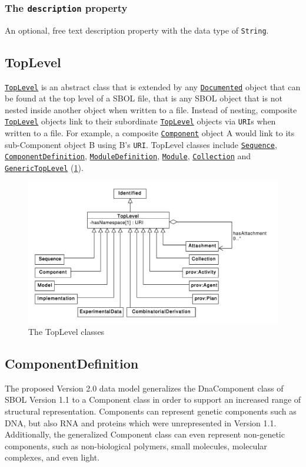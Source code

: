 \documentclass[draftspec]{sbmlpkgspec}
\newcommand{\sbolheading}[1]{\texttt{#1}}
\newcommand{\sbol}[1]{\texttt{\hyperref[sec:#1]{#1}}}
\newcommand{\external}[1]{\texttt{#1}}
\begin{document}
\subsubsection*{The \sbolheading{description} property}
\label{sec:description}
An optional, free text description property with the data type of \external{String}.




\subsection {TopLevel}
\label{sec:TopLevel}
\sbol{TopLevel} is an abstract class that is extended by any \sbol{Documented} object that can be found at the top level of a SBOL file, that is any SBOL object that is not nested inside another object when written to a file. Instead of nesting, composite \sbol{TopLevel} objects link to their subordinate \sbol{TopLevel} objects via \external{URI}s when written to a file. For example, a composite \sbol{Component} object A would link to its sub-Component object B using B's \external{URI}. TopLevel classes include \sbol{Sequence}, \sbol{ComponentDefinition}, \sbol{ModuleDefinition}, \sbol{Module}, \sbol{Collection} and \sbol{GenericTopLevel} (\ref{uml:toplevel}).

\begin{figure}[ht]
\begin{center}
\includegraphics[width=\textwidth]{uml/toplevel}
\caption[]{The TopLevel classes}
\label{uml:toplevel}
\end{center}
\end{figure}




\subsection{ComponentDefinition}
\label{sec:ComponentDefinition}
The proposed Version 2.0 data model generalizes the DnaComponent class of SBOL Version 1.1 to a Component class in order to support an increased range of structural representation. Components can represent genetic components such as DNA, but also RNA and proteins which were unrepresented in Version 1.1.  Additionally, the generalized Component class can even represent non-genetic components, such as non-biological polymers, small molecules, molecular complexes, and even light.
\end{document}
